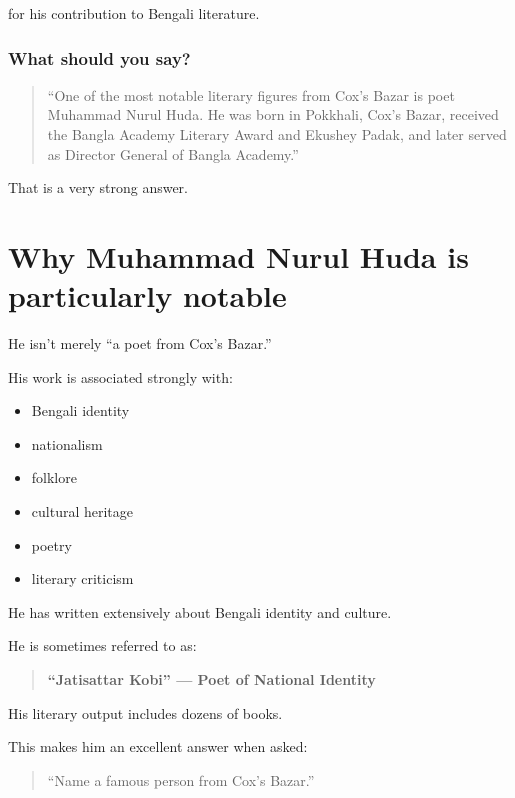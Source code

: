 for his contribution to Bengali literature.

\subsubsection{What should you say?}

\begin{quote}
``One of the most notable literary figures from Cox's Bazar is poet Muhammad Nurul Huda. He was born in Pokkhali, Cox's Bazar, received the Bangla Academy Literary Award and Ekushey Padak, and later served as Director General of Bangla Academy.''\\
\end{quote}

That is a very strong answer.

\medskip

\section{Why Muhammad Nurul Huda is particularly notable}

He isn't merely ``a poet from Cox's Bazar.''

His work is associated strongly with:

\begin{itemize}
  \item Bengali identity
  \item nationalism
  \item folklore
  \item cultural heritage
  \item poetry
  \item literary criticism
\end{itemize}

He has written extensively about Bengali identity and culture.

He is sometimes referred to as:

\begin{quote}
\textbf{``Jatisattar Kobi'' --- Poet of National Identity}\\
\end{quote}

His literary output includes dozens of books.

This makes him an excellent answer when asked:

\begin{quote}
``Name a famous person from Cox's Bazar.''\\
\end{quote}

